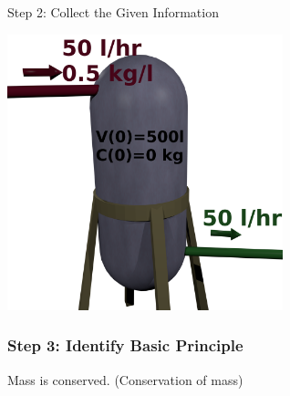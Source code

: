 \begin{frame}{Step 2: Collect the Given Information}

  \includegraphics[width=8cm]{img/singleTankAnnotated}
  
\end{frame}


\begin{frame}
  \frametitle{Step 3: Identify Basic Principle}

  Mass is conserved. (Conservation of mass)

  \vfill


  \vfill


  \vfill

\end{frame}


